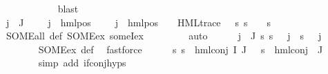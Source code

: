 \begin{isabellebody}
\ \ \ \ \ \ \ \ \ \ \isamarkupfalse%
\ blast\isanewline
\ \ \ \ \ \ \isamarkupfalse%
\isanewline
\ \ \ \ \isacommand{{\isacharbraceright}{\kern0pt}}\isamarkupfalse%
\isanewline
\ \ \isamarkupfalse%
\isanewline
\ \ \ \ \isamarkupfalse%
\ {\isachardoublequoteopen}{\isasymforall}j\ {\isasymin}\ J{\isachardot}{\kern0pt}\ {\isacharparenleft}{\kern0pt}{\isasymexists}{\isasymalpha}\ {\isasympsi}\ {\isasymphi}{\isachardot}{\kern0pt}\ {\isasymPsi}\ j\ {\isacharequal}{\kern0pt}\ hml{\isacharunderscore}{\kern0pt}pos\ {\isasymalpha}\ {\isasympsi}\ {\isasymand}\ {\isasymPhi}\ j\ {\isacharequal}{\kern0pt}\ hml{\isacharunderscore}{\kern0pt}pos\ {\isasymalpha}\ {\isasymphi}\ {\isasymand}\ HML{\isacharunderscore}{\kern0pt}trace\ {\isasympsi}\ {\isasymand}\ {\isacharparenleft}{\kern0pt}{\isasymforall}s{\isachardot}{\kern0pt}\ s\ {\isasymTurnstile}\ {\isasymphi}\ {\isasymlongleftrightarrow}\ s\ {\isasymTurnstile}\ {\isasympsi}{\isacharparenright}{\kern0pt}{\isacharparenright}{\kern0pt}{\isachardoublequoteclose}\ \isanewline
\ \ \ \ \ \ \isamarkupfalse%
\ SOME{\isacharunderscore}{\kern0pt}all\ {\isasymPsi}{\isacharunderscore}{\kern0pt}def\ SOME{\isacharunderscore}{\kern0pt}ex\ someI{\isacharunderscore}{\kern0pt}ex\ \isanewline
\ \ \ \ \ \ \isamarkupfalse%
\ auto\isanewline
\ \ \ \ \isamarkupfalse%
\ {\isachardoublequoteopen}{\isasymforall}j\ {\isasymin}\ J{\isachardot}{\kern0pt}\ {\isasymforall}s{\isachardot}{\kern0pt}\ s\ {\isasymTurnstile}\ {\isasymPsi}\ j\ {\isasymlongleftrightarrow}\ s\ {\isasymTurnstile}\ {\isasymPhi}\ j{\isachardoublequoteclose}\isanewline
\ \ \ \ \ \ \isamarkupfalse%
\ SOME{\isacharunderscore}{\kern0pt}ex\ {\isasymPsi}{\isacharunderscore}{\kern0pt}def\ \isamarkupfalse%
\ fastforce\isanewline
\ \ \ \ \isamarkupfalse%
\ {\isachardoublequoteopen}{\isasymforall}s{\isachardot}{\kern0pt}\ s\ {\isasymTurnstile}\ {\isacharparenleft}{\kern0pt}hml{\isacharunderscore}{\kern0pt}conj\ I\ J\ {\isasymPhi}{\isacharparenright}{\kern0pt}\ {\isasymlongleftrightarrow}\ s\ {\isasymTurnstile}\ {\isacharparenleft}{\kern0pt}hml{\isacharunderscore}{\kern0pt}conj\ {\isacharbraceleft}{\kern0pt}{\isacharbraceright}{\kern0pt}\ J\ {\isasymPsi}{\isacharparenright}{\kern0pt}{\isachardoublequoteclose}\isanewline
\ \ \ \ \ \ \isamarkupfalse%
\ {\isacharparenleft}{\kern0pt}simp\ add{\isacharcolon}{\kern0pt}\ if{\isacharunderscore}{\kern0pt}conj{\isachardot}{\kern0pt}hyps{\isacharparenleft}{\kern0pt}{}{\isacharparenright}{\kern0pt}{\isacharparenright}{\kern0pt}\isanewline

\end{isabellebody}
